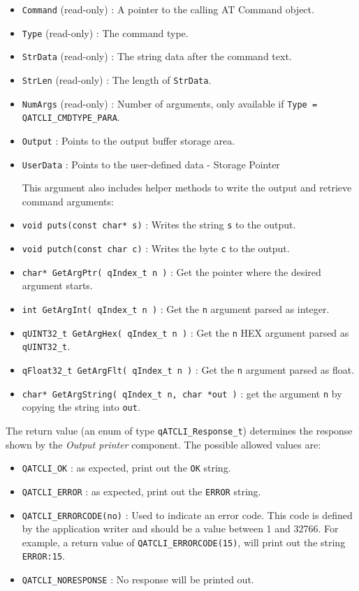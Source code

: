 \begin{itemize}
    \item \lstinline{Command} (read-only) : A pointer to the calling AT Command object.
    \item \lstinline{Type} (read-only) : The command type.
    \item \lstinline{StrData} (read-only) : The string data after the command text.
    \item \lstinline{StrLen} (read-only) : The length of \lstinline{StrData}.
    \item \lstinline{NumArgs} (read-only) : Number of arguments, only available if \lstinline{Type = QATCLI_CMDTYPE_PARA}.
    \item \lstinline{Output} : Points to the output buffer storage area.
    \item \lstinline{UserData} : Points to the user-defined data - Storage Pointer
    
    This argument also includes helper methods to write the output and retrieve command arguments:
    
    \item \lstinline{void puts(const char* s)} : Writes the string \lstinline{s} to the output.
    \item \lstinline{void putch(const char c)} : Writes the byte \lstinline{c} to the output.
    \item \lstinline{char* GetArgPtr( qIndex_t n )} : Get the pointer where the desired argument starts.
    \item \lstinline{int GetArgInt( qIndex_t n )} : Get the \lstinline{n} argument parsed as integer.
    \item \lstinline{qUINT32_t GetArgHex( qIndex_t n )} : Get the \lstinline{n} HEX argument parsed as \lstinline{qUINT32_t}.
    \item \lstinline{qFloat32_t GetArgFlt( qIndex_t n )} : Get the \lstinline{n} argument parsed as float.
    \item \lstinline{char* GetArgString( qIndex_t n, char *out )} :  get the argument \lstinline{n} by copying the string into \lstinline{out}.
\end{itemize}

The return value (an enum of type \lstinline{qATCLI_Response_t})  determines the response shown by the \textit{Output printer} component. The possible allowed values are:

\begin{itemize}
    \item \lstinline{QATCLI_OK} : as expected, print out the \lstinline{OK} string.
    \item \lstinline{QATCLI_ERROR} : as expected, print out the \lstinline{ERROR} string.
    \item \lstinline{QATCLI_ERRORCODE(no)} : Used to indicate an error code. This code is defined by the application writer and should be a value between 1 and 32766. For example, a return value of \lstinline{QATCLI_ERRORCODE(15)}, will print out the string \lstinline{ERROR:15}.
    \item \lstinline{QATCLI_NORESPONSE} : No response will be printed out.
\end{itemize}


